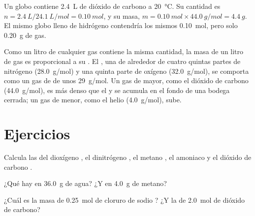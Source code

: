 \begin{example}\label{ex:g10:the-mole:balloon}
Un globo contiene \qty{2.4}{L} de dióxido de carbono a
\qty{20}{\celsius}. Su cantidad es
$n = \qty{2.4}{L} / \qty{24.1}{L/mol} = \qty{0.10}{mol}$,
y su masa, $m = \qty{0.10}{mol} \times \qty{44.0}{g/mol} =
\qty{4.4}{g}$. El mismo globo lleno de hidrógeno contendría los mismos
\qty{0.10}{mol}, pero solo \qty{0.20}{g} de gas.
\end{example}

\begin{remark}\label{rem:g10:the-mole:heavy}
Como un litro de cualquier gas contiene la misma cantidad, la masa de un
litro de gas es proporcional a su . El , una  de
alrededor de cuatro quintas partes de nitrógeno (\qty{28.0}{g/mol}) y
una quinta parte de oxígeno (\qty{32.0}{g/mol}), se comporta como un gas
de  de unos \qty{29}{g/mol}. Un gas de  mayor, como
el dióxido de carbono (\qty{44.0}{g/mol}), es más denso que el  y se
acumula en el fondo de una bodega cerrada; un gas de  menor,
como el helio (\qty{4.0}{g/mol}), sube.
\end{remark}

\section{Ejercicios}

\begin{exercise}[$\star$]\label{exo:g10:the-mole:1}
Calcula las  del dioxígeno , el dinitrógeno
, el metano , el amoniaco  y el dióxido de
carbono .
\end{exercise}

\begin{exercise}[$\star$]\label{exo:g10:the-mole:2}
¿Qué  hay en \qty{36.0}{g} de agua? ¿Y en
\qty{4.0}{g} de metano?
\end{exercise}

\begin{exercise}[$\star$]\label{exo:g10:the-mole:3}
¿Cuál es la masa de \qty{0.25}{mol} de cloruro de sodio ? ¿Y
la de \qty{2.0}{mol} de dióxido de carbono?
\end{exercise}

